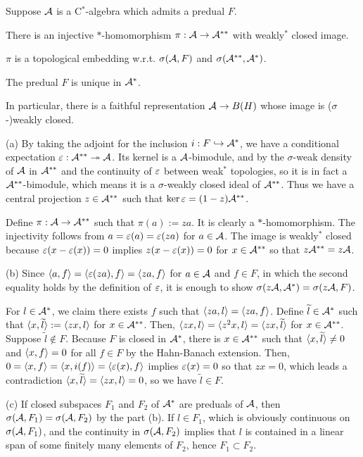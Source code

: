 \documentclass{../../small}
\begin{document}
\begin{thm}[Sakai]
Suppose $\mathcal{A}$ is a C$^*$-algebra which admits a predual $F$.
\begin{parts}
\item There is an injective $*$-homomorphism $\pi:\mathcal{A}\to\mathcal{A}^{**}$ with weakly$^*$ closed image.
\item $\pi$ is a topological embedding w.r.t. $\sigma(\mathcal{A},F)$ and $\sigma(\mathcal{A}^{**},\mathcal{A}^*)$.
\item The predual $F$ is unique in $\mathcal{A}^*$.
\end{parts}
In particular, there is a faithful representation $\mathcal{A}\to B(H)$ whose image is ($\sigma$-)weakly closed.
\end{thm}
\begin{pf}
(a)
By taking the adjoint for the inclusion $i:F\hookrightarrow\mathcal{A}^*$, we have a conditional expectation $\varepsilon:\mathcal{A}^{**}\twoheadrightarrow\mathcal{A}$.
Its kernel is a $\mathcal{A}$-bimodule, and by the $\sigma$-weak density of $\mathcal{A}$ in $\mathcal{A}^{**}$ and the continuity of $\varepsilon$ between weak$^*$ topologies, so it is in fact a $\mathcal{A}^{**}$-bimodule, which means it is a $\sigma$-weakly closed ideal of $\mathcal{A}^{**}$.
Thus we have a central projection $z\in\mathcal{A}^{**}$ such that $\ker\varepsilon=(1-z)\mathcal{A}^{**}$.

Define $\pi:\mathcal{A}\to\mathcal{A}^{**}$ such that $\pi(a):=za$.
It is clearly a $*$-homomorphism.
The injectivity follows from $a=\varepsilon(a)=\varepsilon(za)$ for $a\in\mathcal{A}$.
The image is weakly$^*$ closed because $\varepsilon(x-\varepsilon(x))=0$ implies $z(x-\varepsilon(x))=0$ for $x\in\mathcal{A}^{**}$ so that $z\mathcal{A}^{**}=z\mathcal{A}$.

(b)
Since $\langle a,f\rangle=\langle\varepsilon(za),f\rangle=\langle za,f\rangle$ for $a\in\mathcal{A}$ and $f\in F$, in which the second equality holds by the definition of $\varepsilon$, it is enough to show $\sigma(z\mathcal{A},\mathcal{A}^*)=\sigma(z\mathcal{A},F)$.

For $l\in\mathcal{A}^*$, we claim there exists $f$ such that $\langle za,l\rangle=\langle za,f\rangle$.
Define $\widetilde l\in\mathcal{A}^*$ such that $\langle x,\widetilde l\rangle:=\langle zx,l\rangle$ for $x\in\mathcal{A}^{**}$.
Then, $\langle zx,l\rangle=\langle z^2x,l\rangle=\langle zx,\widetilde l\rangle$ for $x\in\mathcal{A}^{**}$.
Suppose $\tilde l\notin F$.
Because $F$ is closed in $\mathcal{A}^*$, there is $x\in\mathcal{A}^{**}$ such that $\langle x,\widetilde l\rangle\ne0$ and $\langle x,f\rangle=0$ for all $f\in F$ by the Hahn-Banach extension.
Then, $0=\langle x,f\rangle=\langle x,i(f)\rangle=\langle\varepsilon(x),f\rangle$ implies $\varepsilon(x)=0$ so that $zx=0$, which leads a contradiction $\langle x,\widetilde l\rangle=\langle zx,l\rangle=0$, so we have $\tilde l\in F$.

(c)
If closed subspaces $F_1$ and $F_2$ of $\mathcal{A}^*$ are preduals of $\mathcal{A}$, then $\sigma(\mathcal{A},F_1)=\sigma(\mathcal{A},F_2)$ by the part (b).
If $l\in F_1$, which is obviously continuous on $\sigma(\mathcal{A},F_1)$, and the continuity in $\sigma(\mathcal{A},F_2)$ implies that $l$ is contained in a linear span of some finitely many elements of $F_2$, hence $F_1\subset F_2$.
\end{pf}
\end{document}

